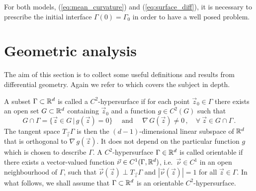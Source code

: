For both models, (\ref{eq:mean_curvature}) and (\ref{eq:surface_diff}), it is
necessary to prescribe the initial interface $\Gamma(0)=\Gamma_0$ in order to
have a well posed problem.

\section{Geometric analysis}\label{sec:geometric_analysis}
The aim of this section is to collect some useful definitions and results from
differential geometry. Again we refer to \cite{DeckelnickDE05} which covers the
subject in depth.

A subset $\Gamma \subset \mathbb R^d$ is called a $C^2$-hypersurface if for each point
$\vec z_0 \in \Gamma$ there exists an open set $G \subset \mathbb R^d$ containing
$\vec z_0$ and a function $g \in C^2(G)$ such that
\begin{equation}
G \cap \Gamma = \{ \vec z \in G \, | \, g(\vec z) = 0 \}
\quad \mbox{ and } \quad \nabla \, G(\vec z) \neq 0\,,
\quad \forall\ \vec z \in G \cap \Gamma \, .
\end{equation}
The tangent space $T_{\vec z} \Gamma$ is then the $(d-1)$-dimensional linear
subspace of $\mathbb R^d$ that is orthogonal to $\nabla \, g(\vec z)$. It does not
depend on the particular function $g$ which is chosen to describe $\Gamma$. A
$C^2$-hypersurface $\Gamma \in \mathbb R^d$ is called orientable if there exists a
vector-valued function $\vec\nu \in C^1(\Gamma, \mathbb R^d)$, i.e.~$\vec\nu \in C^1$
in an open neighbourhood of $\Gamma$, such that $\vec\nu(\vec z) \perp T_{\vec
z} \Gamma$ and $|\vec \nu(\vec z)| = 1$ for all $\vec z \in \Gamma$. In what
follows, we shall assume that $\Gamma \subset \mathbb R^d$ is an orientable
$C^2$-hypersurface.

